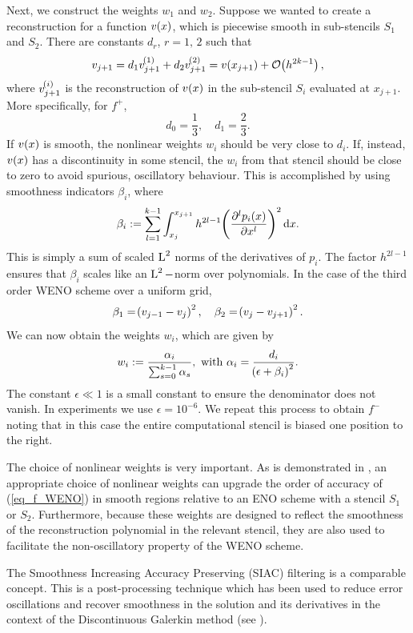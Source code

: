 \documentclass[final]{amsart}
\numberwithin{equation}{section}
\begin{document}
Next, we construct the weights $w_1$ and $w_2$.  Suppose
we wanted to create a reconstruction for a function $v\!\left({x}\right)$, which
is piecewise smooth in sub-stencils $S_1$ and $S_2$.  There are
constants $d_r$, $r=1,\,2$ such that
\begin{equation}
v_{j+1}=d_1v_{j+1}^{\!\left({1}\right)} +d_2v_{j+1}^{\!\left({2}\right)}=v\!\left({x_{j+1}}\right)+\mathcal{O}\!\left({h^{2k-1}}\right),
\end{equation} 
where $v^{\!\left({i}\right)}_{j+1}$ is the reconstruction of $v\!\left({x}\right)$ in the sub-stencil $S_i$ evaluated at $x_{j+1}$.  More specifically, for $f^+$,
\begin{equation}
d_0 = \frac{1}{3},\quad d_1=\frac{2}{3}.
\end{equation}
If $v\!\left({x}\right)$ is smooth, the nonlinear weights $w_i$ should
be very close to $d_i$.  If, instead, $v\!\left({x}\right)$ has a discontinuity in some
stencil, the $w_i$ from that stencil should be close to zero to avoid spurious, oscillatory behaviour.
This is accomplished by using smoothness indicators $\beta_i$, where
\begin{equation}
\beta_i:=\sum_{l=1}^{k-1}\int^{x_{j+1}}_{x_j}h^{2l-1}\!\left({\frac{\partial^lp_i\!\left({x}\right)}{\partial x^l}}\right)^2\mathrm{d}x.
\end{equation}
This is simply a sum of scaled $\operatorname L^{2}$ norms of the derivatives of $p_i$.  The factor $h^{2l-1}$ ensures that $\beta_i$ scales like an $\operatorname L^{2}-$norm over polynomials. In the case of the third order WENO scheme over a uniform grid, 
\begin{equation}
\beta_1=\!\left({v_{j-1}-v_j}\right)^2,\quad \beta_2=\!\left({v_j-v_{j+1}}\right)^2.
\end{equation}
We can now obtain the weights $w_i$, which are given by
\begin{equation}\label{eq_non_lin_weights}
w_i:=\frac{\alpha_i}{\sum_{s=0}^{k-1}\alpha_s},  \text{ with  }\alpha_i = \frac{d_i}{\!\left({\epsilon +\beta_i}\right)^2}.
\end{equation}
The constant $\epsilon \ll 1$ is a small constant to ensure the
denominator does not vanish.  In experiments we use
$\epsilon=10^{-6}$.  We repeat this process to obtain $f^-$ noting
that in this case the entire computational stencil is biased one
position to the right.


\begin{Rem}
	The choice of nonlinear weights is very important.  As is
	demonstrated in \cite{jiang1996efficient}, an appropriate choice of
	nonlinear weights can upgrade the order of accuracy of
	(\ref{eq_f_WENO}) in smooth regions relative to an ENO scheme with a stencil $S_1$ or $S_2$.  Furthermore, because these weights are
	designed to reflect the smoothness of the reconstruction polynomial
	in the relevant stencil, they are also used to facilitate the
	non-oscillatory property of the WENO scheme.  
	
	The Smoothness Increasing Accuracy Preserving (SIAC) filtering is a comparable concept.  This is a post-processing technique which has been used to reduce error oscillations and recover smoothness in the solution and its derivatives in the context of the Discontinuous Galerkin method (see \cite{dedner2019residual}).
\end{Rem}
\end{document}
